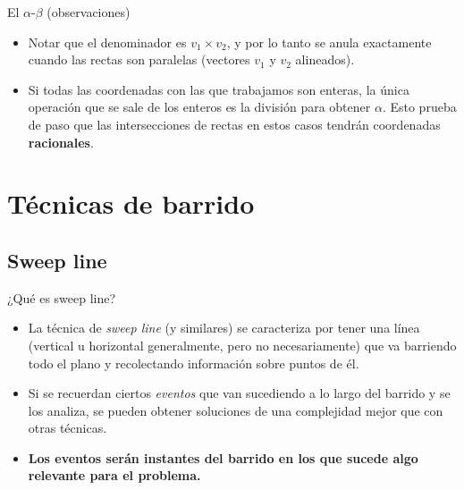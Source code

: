 \documentclass[compress]{beamer}
\begin{document}
\begin{frame}{El $\alpha$-$\beta$ (observaciones)}

    \begin{itemize}
        \item Notar que el denominador es $v_1 \times v_2$, y por lo tanto se anula exactamente cuando las rectas son paralelas (vectores $v_1$ y $v_2$ alineados).
        \item Si todas las coordenadas con las que trabajamos son enteras, la única operación que se sale de los enteros es la división para obtener $\alpha$. Esto prueba de paso que las intersecciones de rectas en estos casos tendrán coordenadas \textbf{racionales}.
    \end{itemize}

\end{frame}    






\section{Técnicas de barrido}

\subsection{Sweep line}

\begin{frame}{¿Qu\'e es sweep line?}
\begin{itemize}
\item La t\'ecnica de \emph{sweep line} (y similares) se caracteriza por tener una l\'inea (vertical u horizontal generalmente, pero no necesariamente) que va barriendo todo el plano y recolectando informaci\'on sobre puntos de \'el.

\bigskip 
%
\item Si se recuerdan ciertos {\it eventos} que van sucediendo a lo largo del barrido y se los analiza, se pueden obtener soluciones de una complejidad mejor que con otras t\'ecnicas.
\bigskip
\item \textbf{Los eventos ser\'an instantes del barrido en los que sucede algo relevante para el problema.}
\end{itemize}
\end{frame}
\end{document}
